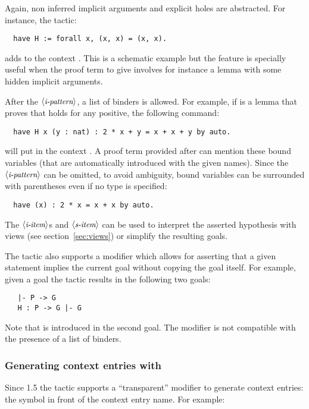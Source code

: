Again, non inferred implicit arguments and explicit holes are abstracted. For
instance, the tactic:
\begin{lstlisting}
  have H := forall x, (x, x) = (x, x).
\end{lstlisting}
adds to the context . This is a schematic example but
the feature is specially useful when the proof term to give involves
for instance a lemma with some hidden implicit arguments.

After the $\langle\mbox{\itshape\rmfamily\small i-pattern}\rangle$, a list of binders is allowed.
For example, if  is a lemma that proves that
 holds for any positive, the following command:
\begin{lstlisting}
  have H x (y : nat) : 2 * x + y = x + x + y by auto.
\end{lstlisting}
will put in the context . A proof term
provided after \C{:=} can mention these bound variables (that are
automatically introduced with the given names).
Since the $\langle\mbox{\itshape\rmfamily\small i-pattern}\rangle$ can be omitted, to avoid ambiguity, bound variables
can be surrounded with parentheses even if no type is specified:
\begin{lstlisting}
  have (x) : 2 * x = x + x by auto.
\end{lstlisting}

The $\langle\mbox{\itshape\rmfamily\small i-item}\rangle$s and $\langle\mbox{\itshape\rmfamily\small s-item}\rangle$ can be used to interpret the
asserted hypothesis with views (see section~\ref{sec:views}) or
simplify the resulting goals.

The  tactic also supports a  modifier which allows for
asserting that a given statement implies the current goal without
copying the goal itself. For example, given a goal  the tactic
 results in the following two goals:
\begin{lstlisting}
   |- P -> G
   H : P -> G |- G
\end{lstlisting}
Note that  is introduced in the second goal. The 
modifier is not compatible with the presence of a list of binders.

\subsubsection*{Generating  context entries with }
\label{sec:havetransparent}

Since \ssr{} 1.5 the  tactic supports a ``transparent'' modifier to
generate  context entries: the  symbol in front of the context
entry name.  For example:

